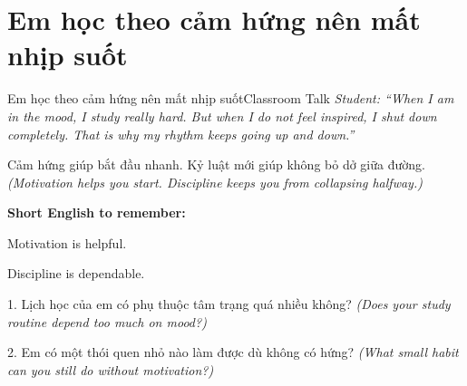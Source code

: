 \section{Em học theo cảm hứng nên mất nhịp suốt}
\begin{truyen}{Em học theo cảm hứng nên mất nhịp suốt}{Classroom Talk}
\textit{Student: ``When I am in the mood, I study really hard. But when I do not feel inspired, I shut down completely. That is why my rhythm keeps going up and down.''}\\[4pt]



\end{truyen}

\begin{baihoc}
Cảm hứng giúp bắt đầu nhanh. Kỷ luật mới giúp không bỏ dở giữa đường.
\textit{(Motivation helps you start. Discipline keeps you from collapsing halfway.)}
\end{baihoc}

\begin{ghinhoanh}
\textbf{Short English to remember:}

Motivation is helpful.

Discipline is dependable.
\end{ghinhoanh}

\begin{tuhocnhanh}
1. Lịch học của em có phụ thuộc tâm trạng quá nhiều không? \textit{(Does your study routine depend too much on mood?)}

2. Em có một thói quen nhỏ nào làm được dù không có hứng? \textit{(What small habit can you still do without motivation?)}
\end{tuhocnhanh}
\ngancach

